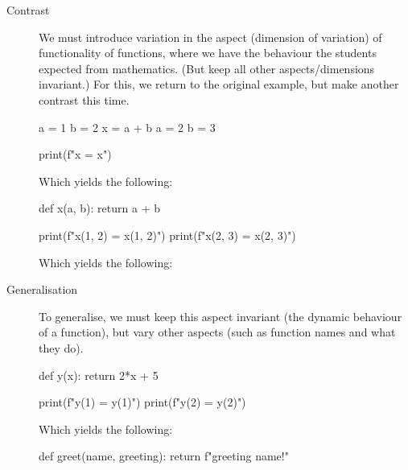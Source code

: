 \begin{description}
  \item [Contrast] We must introduce variation in the aspect (dimension of 
    variation) of functionality of functions, where we have the behaviour the 
    students expected from mathematics.
    (But keep all other aspects/dimensions invariant.)
    For this, we return to the original example, but make another contrast this 
    time.

    \begin{minipage}[t]{0.45\columnwidth}
      \begin{pyblock}[funcC1][highlightlines=3]
a = 1
b = 2
x = a + b
a = 2
b = 3

print(f"x = {x}")
      \end{pyblock}

      Which yields the following:
      \printpythontex[verbatim]
    \end{minipage}
    \hfill
    \begin{minipage}[t]{0.45\columnwidth}
      \begin{pyblock}[funcC2][highlightlines={1-2}]
def x(a, b):
  return a + b



print(f"x(1, 2) = {x(1, 2)}")
print(f"x(2, 3) = {x(2, 3)}")
      \end{pyblock}

      Which yields the following:
      \printpythontex[verbatim]
    \end{minipage}

  \item[Generalisation] To generalise, we must keep this aspect invariant (the 
    dynamic behaviour of a function), but vary other aspects (such as function 
    names and what they do).

    \begin{minipage}[t]{0.45\columnwidth}
      \begin{pyblock}[funcG1]
def y(x):
  return 2*x + 5

print(f"y(1) = {y(1)}")
print(f"y(2) = {y(2)}")
      \end{pyblock}

      Which yields the following:
      \printpythontex[verbatim]
    \end{minipage}
    \hfill
    \begin{minipage}[t]{0.45\columnwidth}
      \begin{pyblock}[funcG2]
def greet(name, greeting):
  return f"{greeting} {name}!"


\end{pyblock}
\end{minipage}
\end{description}
